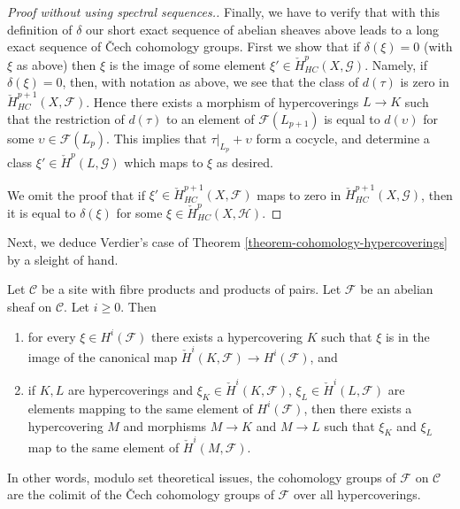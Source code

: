 \begin{proof}[Proof without using spectral sequences.]
\medskip\noindent
Finally, we have to verify that with this definition of $\delta$
our short exact sequence of abelian sheaves above leads to a
long exact sequence of {\v C}ech cohomology groups.
First we show that if $\delta(\xi) = 0$ (with $\xi$ as above) then
$\xi$ is the image of some element
$\xi' \in \check{H}^p_{HC}(X, \mathcal{G})$.
Namely, if $\delta(\xi) = 0$, then, with notation as above, we
see that the class of $d(\tau)$ is zero in
$\check{H}^{p + 1}_{HC}(X, \mathcal{F})$. Hence there exists
a morphism of hypercoverings $L \to K$ such that the restriction
of $d(\tau)$ to an element of $\mathcal{F}(L_{p + 1})$ is
equal to $d(\upsilon)$ for some $\upsilon \in \mathcal{F}(L_p)$.
This implies that $\tau|_{L_p} + \upsilon$ form a
cocycle, and determine a class $\xi' \in \check{H}^p(L, \mathcal{G})$
which maps to $\xi$ as desired.

\medskip\noindent
We omit the proof that if $\xi' \in \check{H}^{p + 1}_{HC}(X, \mathcal{F})$
maps to zero in $\check{H}^{p + 1}_{HC}(X, \mathcal{G})$, then it is
equal to $\delta(\xi)$ for some $\xi \in \check{H}^p_{HC}(X, \mathcal{H})$.
\end{proof}

\noindent
Next, we deduce Verdier's case of
Theorem \ref{theorem-cohomology-hypercoverings}
by a sleight of hand.

\begin{proposition}
\label{proposition-cohomology-hypercoverings}
Let $\mathcal{C}$ be a site with fibre products and products of pairs.
Let $\mathcal{F}$ be an abelian sheaf on $\mathcal{C}$.
Let $i \geq 0$. Then
\begin{enumerate}
\item for every $\xi \in H^i(\mathcal{F})$ there exists a hypercovering
$K$ such that $\xi$ is in the image of the canonical map
$\check{H}^i(K, \mathcal{F}) \to H^i(\mathcal{F})$, and
\item if $K, L$ are hypercoverings and $\xi_K \in \check{H}^i(K, \mathcal{F})$,
$\xi_L \in \check{H}^i(L, \mathcal{F})$ are elements mapping
to the same element of $H^i(\mathcal{F})$, then there exists
a hypercovering $M$ and morphisms $M \to K$ and $M \to L$ such
that $\xi_K$ and $\xi_L$ map to the same element of
$\check{H}^i(M, \mathcal{F})$.
\end{enumerate}
In other words, modulo set theoretical issues, the cohomology
groups of $\mathcal{F}$ on $\mathcal{C}$ are the colimit of
the {\v C}ech cohomology groups of $\mathcal{F}$ over all hypercoverings.
\end{proposition}

